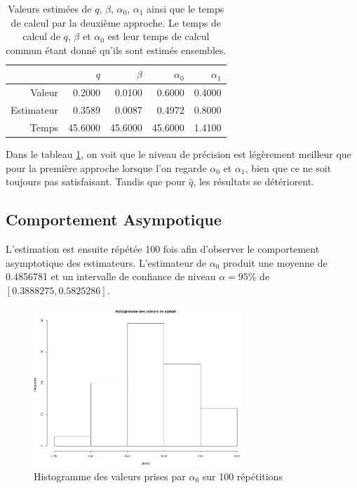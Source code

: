 \documentclass[11pt]{article}
\begin{document}
	\begin{table}[H]
		\centering
		\begin{tabular}{rrrrr}
		  \hline
		 	& $q$ & $\beta$ & $\alpha_{0}$ & $\alpha_{1}$ \\  
		  \hline
			Valeur & 0.2000 & 0.0100 & 0.6000 & 0.4000 \\ 
			Estimateur & 0.3589 & 0.0087 & 0.4972 & 0.8000 \\ 
			Temps & 45.6000 & 45.6000 & 45.6000 & 1.4100 \\ 
		   \hline
		\end{tabular}
	 		\caption{Valeurs estimées de $q$, $\beta$, $\alpha_{0}$, $\alpha_{1}$ ainsi que le temps de calcul par la deuxième approche. Le temps de calcul de $q$, $\beta$ et $\alpha_{0}$ est leur temps de calcul commun étant donné qu'ils sont estimés ensembles.}
	 	\label{resultats_app2}
	\end{table}

	Dans le tableau \ref{resultats_app2}, on voit que le niveau de précision est légèrement meilleur que pour la première approche lorsque l'on regarde $\alpha_{0}$ et $\alpha_{1}$, bien que ce ne soit toujours pas satisfaisant. Tandis que pour $\hat{q}$, les résultats se détériorent.

\subsection{Comportement Asympotique}

	L'estimation est ensuite répétée 100 fois afin d'observer le comportement asymptotique des estimateurs.
	L'estimateur de $\alpha_{0}$ produit une moyenne de 0.4856781 et un intervalle de confiance de niveau $\alpha = 95\%$ de $[0.3888275,0.5825286]$.
	
	\begin{figure}[H]
		\centering
		\includegraphics[height=6cm]{graph/alpha02.png}
		\caption[Paramètre $\alpha_{0}$]{Histogramme des valeurs prises par $\alpha_{0}$ sur 100 répétitions} 
		\label{alpha02}
	\end{figure}
		
\end{document}
